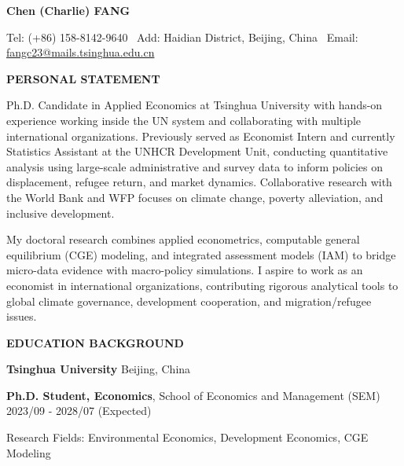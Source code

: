 \documentclass[UTF8]{ctexbook}
\begin{document}
\begin{center}
    \textbf{Chen (Charlie) FANG}\\
    \hrulefill
\end{center}

\begin{center}
    Tel: (+86) 158-8142-9640 \textbullet \ Add: Haidian District, Beijing, China \textbullet \ Email: \href{mailto:fangc23@mails.tsinghua.edu.cn}{fangc23@mails.tsinghua.edu.cn}
\end{center}

\vspace{6pt}

\begin{center}
    \textbf{PERSONAL STATEMENT}
\end{center}

\small Ph.D. Candidate in Applied Economics at Tsinghua University with hands-on experience working inside the UN system and collaborating with multiple international organizations. Previously served as Economist Intern and currently Statistics Assistant at the UNHCR Development Unit, conducting quantitative analysis using large-scale administrative and survey data to inform policies on displacement, refugee return, and market dynamics. Collaborative research with the World Bank and WFP focuses on climate change, poverty alleviation, and inclusive development.

\smallskip

\small My doctoral research combines applied econometrics, computable general equilibrium (CGE) modeling, and integrated assessment models (IAM) to bridge micro-data evidence with macro-policy simulations. I aspire to work as an economist in international organizations, contributing rigorous analytical tools to global climate governance, development cooperation, and migration/refugee issues.

\normalsize
\vspace{12pt}

\begin{center}
    \textbf{EDUCATION BACKGROUND}
\end{center}

\textbf{Tsinghua University} \hfill Beijing, China

\quad \textbf{Ph.D. Student, Economics}, School of Economics and Management (SEM) \hfill 2023/09 - 2028/07 (Expected)

\quad Research Fields: Environmental Economics, Development Economics, CGE Modeling
\end{document}
